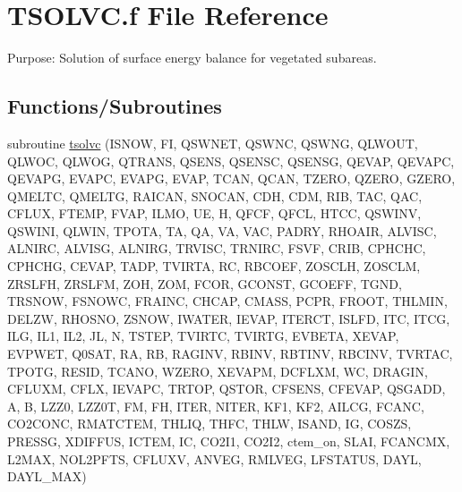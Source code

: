 \hypertarget{TSOLVC_8f}{}\section{T\+S\+O\+L\+V\+C.\+f File Reference}
\label{TSOLVC_8f}


Purpose\+: Solution of surface energy balance for vegetated subareas.  


\subsection*{Functions/\+Subroutines}
\begin{DoxyCompactItemize}
\item 
subroutine \hyperlink{TSOLVC_8f_a45f2f7d56f1e5097a5eb9ffb8b2e7d8d}{tsolvc} (I\+S\+N\+O\+W, F\+I, Q\+S\+W\+N\+E\+T, Q\+S\+W\+N\+C, Q\+S\+W\+N\+G, Q\+L\+W\+O\+U\+T, Q\+L\+W\+O\+C, Q\+L\+W\+O\+G, Q\+T\+R\+A\+N\+S, Q\+S\+E\+N\+S, Q\+S\+E\+N\+S\+C, Q\+S\+E\+N\+S\+G, Q\+E\+V\+A\+P, Q\+E\+V\+A\+P\+C, Q\+E\+V\+A\+P\+G, E\+V\+A\+P\+C, E\+V\+A\+P\+G, E\+V\+A\+P, T\+C\+A\+N, Q\+C\+A\+N, T\+Z\+E\+R\+O, Q\+Z\+E\+R\+O, G\+Z\+E\+R\+O, Q\+M\+E\+L\+T\+C, Q\+M\+E\+L\+T\+G, R\+A\+I\+C\+A\+N, S\+N\+O\+C\+A\+N, C\+D\+H, C\+D\+M, R\+I\+B, T\+A\+C, Q\+A\+C, C\+F\+L\+U\+X, F\+T\+E\+M\+P, F\+V\+A\+P, I\+L\+M\+O, U\+E, H, Q\+F\+C\+F, Q\+F\+C\+L, H\+T\+C\+C, Q\+S\+W\+I\+N\+V, Q\+S\+W\+I\+N\+I, Q\+L\+W\+I\+N, T\+P\+O\+T\+A, T\+A, Q\+A, V\+A, V\+A\+C, P\+A\+D\+R\+Y, R\+H\+O\+A\+I\+R, A\+L\+V\+I\+S\+C, A\+L\+N\+I\+R\+C, A\+L\+V\+I\+S\+G, A\+L\+N\+I\+R\+G, T\+R\+V\+I\+S\+C, T\+R\+N\+I\+R\+C, F\+S\+V\+F, C\+R\+I\+B, C\+P\+H\+C\+H\+C, C\+P\+H\+C\+H\+G, C\+E\+V\+A\+P, T\+A\+D\+P, T\+V\+I\+R\+T\+A, R\+C, R\+B\+C\+O\+E\+F, Z\+O\+S\+C\+L\+H, Z\+O\+S\+C\+L\+M, Z\+R\+S\+L\+F\+H, Z\+R\+S\+L\+F\+M, Z\+O\+H, Z\+O\+M, F\+C\+O\+R, G\+C\+O\+N\+S\+T, G\+C\+O\+E\+F\+F, T\+G\+N\+D, T\+R\+S\+N\+O\+W, F\+S\+N\+O\+W\+C, F\+R\+A\+I\+N\+C, C\+H\+C\+A\+P, C\+M\+A\+S\+S, P\+C\+P\+R, F\+R\+O\+O\+T, T\+H\+L\+M\+I\+N, D\+E\+L\+Z\+W, R\+H\+O\+S\+N\+O, Z\+S\+N\+O\+W, I\+W\+A\+T\+E\+R, I\+E\+V\+A\+P, I\+T\+E\+R\+C\+T, I\+S\+L\+F\+D, I\+T\+C, I\+T\+C\+G, I\+L\+G, I\+L1, I\+L2, J\+L, N, T\+S\+T\+E\+P, T\+V\+I\+R\+T\+C, T\+V\+I\+R\+T\+G, E\+V\+B\+E\+T\+A, X\+E\+V\+A\+P, E\+V\+P\+W\+E\+T, Q0\+S\+A\+T, R\+A, R\+B, R\+A\+G\+I\+N\+V, R\+B\+I\+N\+V, R\+B\+T\+I\+N\+V, R\+B\+C\+I\+N\+V, T\+V\+R\+T\+A\+C, T\+P\+O\+T\+G, R\+E\+S\+I\+D, T\+C\+A\+N\+O, W\+Z\+E\+R\+O, X\+E\+V\+A\+P\+M, D\+C\+F\+L\+X\+M, W\+C, D\+R\+A\+G\+I\+N, C\+F\+L\+U\+X\+M, C\+F\+L\+X, I\+E\+V\+A\+P\+C, T\+R\+T\+O\+P, Q\+S\+T\+O\+R, C\+F\+S\+E\+N\+S, C\+F\+E\+V\+A\+P, Q\+S\+G\+A\+D\+D, A, B, L\+Z\+Z0, L\+Z\+Z0\+T, F\+M, F\+H, I\+T\+E\+R, N\+I\+T\+E\+R, K\+F1, K\+F2, A\+I\+L\+C\+G, F\+C\+A\+N\+C, C\+O2\+C\+O\+N\+C, R\+M\+A\+T\+C\+T\+E\+M, T\+H\+L\+I\+Q, T\+H\+F\+C, T\+H\+L\+W, I\+S\+A\+N\+D, I\+G, C\+O\+S\+Z\+S, P\+R\+E\+S\+S\+G, X\+D\+I\+F\+F\+U\+S, I\+C\+T\+E\+M, I\+C, C\+O2\+I1, C\+O2\+I2, ctem\+\_\+on, S\+L\+A\+I, F\+C\+A\+N\+C\+M\+X, L2\+M\+A\+X, N\+O\+L2\+P\+F\+T\+S, C\+F\+L\+U\+X\+V, A\+N\+V\+E\+G, R\+M\+L\+V\+E\+G, L\+F\+S\+T\+A\+T\+U\+S, D\+A\+Y\+L, D\+A\+Y\+L\+\_\+\+M\+A\+X)
\end{DoxyCompactItemize}


